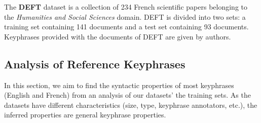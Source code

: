     The \textbf{DEFT} dataset \cite{Paroubek2012deft} is a collection of 234
    French scientific papers belonging to the \textit{Humanities and Social
    Sciences} domain. DEFT is divided into two sets: a training set containing
    141 documents and a test set containing 93 documents. Keyphrases provided
    with the documents of DEFT are given by authors.

  \subsection{Analysis of Reference Keyphrases}
  \label{subsec:keyphrase_analysis}
    In this section, we aim to find the syntactic properties of most keyphrases
    (English and French) from an analysis of our datasets' the training sets. As
    the datasets have different characteristics (size, type, keyphrase
    annotators, etc.), the inferred properties are general keyphrase properties.

